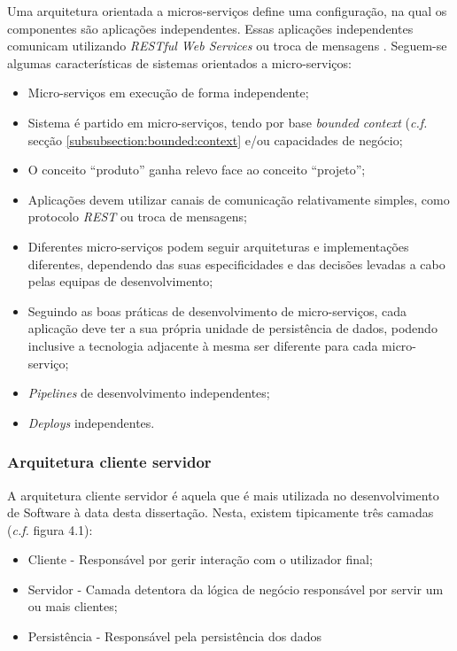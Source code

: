 Uma arquitetura orientada a micros-serviços define uma configuração, na qual os componentes são aplicações independentes. Essas aplicações independentes comunicam utilizando \emph{RESTful Web Services} ou troca de mensagens \cite{building_microservices:2015}.
Seguem-se algumas características de sistemas orientados a micro-serviços\cite{monolith_to_microservices}:
\begin{itemize}
\item Micro-serviços em execução de forma independente;
\item Sistema é partido em micro-serviços, tendo por base \emph{bounded context} (\emph{c.f.} secção \ref{subsubsection:bounded:context} e/ou capacidades de negócio;
\item O conceito “produto” ganha relevo face ao conceito “projeto”;
\item Aplicações devem utilizar canais de comunicação relativamente simples, como protocolo \emph{REST} ou troca de mensagens;
\item Diferentes micro-serviços podem seguir arquiteturas e implementações diferentes, dependendo das suas especificidades e das decisões levadas a cabo pelas equipas de desenvolvimento;
\item Seguindo as boas práticas de desenvolvimento de micro-serviços, cada aplicação deve ter a sua própria unidade de persistência de dados, podendo inclusive a tecnologia adjacente à mesma ser diferente para cada micro-serviço;
\item \emph{Pipelines} de desenvolvimento independentes;
\item \emph{Deploys} independentes.
\end{itemize}

\subsubsection{Arquitetura cliente servidor \label{estado_arte_cliente_servidor}}
A arquitetura cliente servidor é aquela que é mais utilizada no desenvolvimento de Software à data desta dissertação. Nesta, existem tipicamente três camadas (\emph{c.f.} figura 4.1):

\begin{itemize}
    \item Cliente - Responsável por gerir interação com o utilizador final;
    \item Servidor - Camada detentora da lógica de negócio responsável por servir um ou mais clientes;
    \item Persistência - Responsável pela persistência dos dados
\end{itemize}

